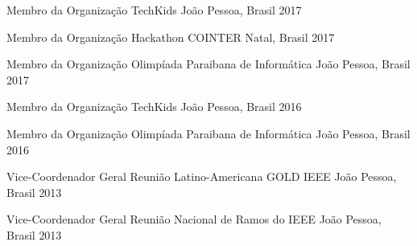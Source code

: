 \begin{cvhonors}

  \cvhonor
    {Membro da Organização}
    {TechKids}
    {João Pessoa, Brasil}
    {2017}

  \cvhonor
    {Membro da Organização}
    {Hackathon COINTER}
    {Natal, Brasil}
    {2017}
%

  \cvhonor
    {Membro da Organização}
    {Olimpíada Paraibana de Informática}
    {João Pessoa, Brasil}
    {2017}


  \cvhonor
    {Membro da Organização}
    {TechKids}
    {João Pessoa, Brasil}
    {2016}

  \cvhonor
    {Membro da Organização}
    {Olimpíada Paraibana de Informática}
    {João Pessoa, Brasil}
    {2016}

  \cvhonor
    {Vice-Coordenador Geral}
    {Reunião Latino-Americana GOLD IEEE}
    {João Pessoa, Brasil}
    {2013}

  \cvhonor
    {Vice-Coordenador Geral}
    {Reunião Nacional de Ramos do IEEE}
    {João Pessoa, Brasil}
    {2013}
\end{cvhonors}
